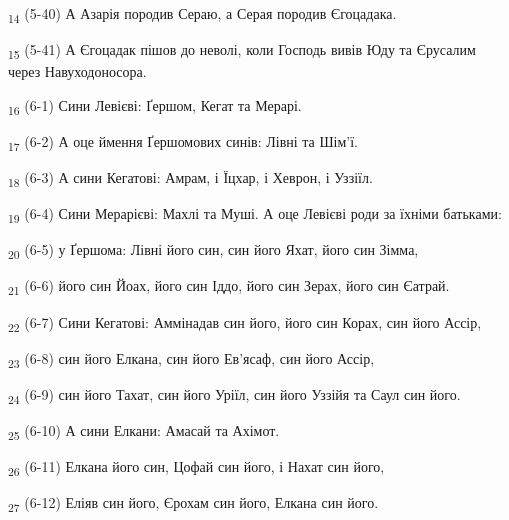 \begin{tcolorbox}
\textsubscript{14} (5-40) А Азарія породив Сераю, а Серая породив Єгоцадака.
\end{tcolorbox}
\begin{tcolorbox}
\textsubscript{15} (5-41) А Єгоцадак пішов до неволі, коли Господь вивів Юду та Єрусалим через Навуходоносора.
\end{tcolorbox}
\begin{tcolorbox}
\textsubscript{16} (6-1) Сини Левієві: Ґершом, Кегат та Мерарі.
\end{tcolorbox}
\begin{tcolorbox}
\textsubscript{17} (6-2) А оце ймення Ґершомових синів: Лівні та Шім'ї.
\end{tcolorbox}
\begin{tcolorbox}
\textsubscript{18} (6-3) А сини Кегатові: Амрам, і Їцхар, і Хеврон, і Уззіїл.
\end{tcolorbox}
\begin{tcolorbox}
\textsubscript{19} (6-4) Сини Мерарієві: Махлі та Муші. А оце Левієві роди за їхніми батьками:
\end{tcolorbox}
\begin{tcolorbox}
\textsubscript{20} (6-5) у Ґершома: Лівні його син, син його Яхат, його син Зімма,
\end{tcolorbox}
\begin{tcolorbox}
\textsubscript{21} (6-6) його син Йоах, його син Іддо, його син Зерах, його син Єатрай.
\end{tcolorbox}
\begin{tcolorbox}
\textsubscript{22} (6-7) Сини Кегатові: Аммінадав син його, його син Корах, син його Ассір,
\end{tcolorbox}
\begin{tcolorbox}
\textsubscript{23} (6-8) син його Елкана, син його Ев'ясаф, син його Ассір,
\end{tcolorbox}
\begin{tcolorbox}
\textsubscript{24} (6-9) син його Тахат, син його Уріїл, син його Уззійя та Саул син його.
\end{tcolorbox}
\begin{tcolorbox}
\textsubscript{25} (6-10) А сини Елкани: Амасай та Ахімот.
\end{tcolorbox}
\begin{tcolorbox}
\textsubscript{26} (6-11) Елкана його син, Цофай син його, і Нахат син його,
\end{tcolorbox}
\begin{tcolorbox}
\textsubscript{27} (6-12) Еліяв син його, Єрохам син його, Елкана син його.
\end{tcolorbox}
